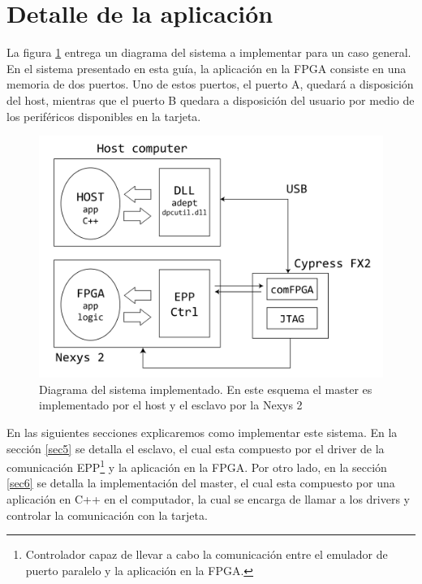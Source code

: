 \documentclass[11pt,letterpaper,spanish]{article}
\begin{document}
\section{Detalle de la aplicación}

La figura \ref{sistema_completo} entrega un diagrama del sistema a implementar para un caso general. En el sistema presentado en esta guía, la aplicación en la FPGA consiste en una memoria de dos puertos. Uno de estos puertos, el puerto A, quedará a disposición del host, mientras que el  puerto B quedara a disposición del usuario por medio de los periféricos disponibles en la tarjeta.

\begin{figure}[h!]
\begin{center}
\includegraphics[scale=0.5]{figuras/sistema_total.png} 
\caption{\label{sistema_completo} Diagrama del sistema implementado. En este esquema el master es implementado por el host y el esclavo por la Nexys 2}
\end{center}
\end{figure}

 En las siguientes secciones explicaremos como implementar este sistema. En la sección \ref{sec5} se detalla el esclavo, el cual esta compuesto por el driver de la comunicación EPP\footnote{ Controlador capaz de llevar a cabo la comunicación entre el emulador de puerto paralelo y la aplicación en la FPGA.} y la aplicación en la FPGA. Por otro lado, en la sección \ref{sec6} se detalla la implementación del master, el cual esta compuesto por una aplicación en C++ en el computador, la cual se encarga de llamar a los drivers y controlar la comunicación con la tarjeta.
\end{document}
